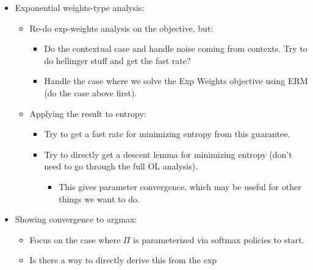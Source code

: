 \documentclass{article}
\begin{document}
\begin{itemize}
\item Exponential weights-type analysis:
  \begin{itemize}
  \item Re-do exp-weights analysis on the objective, but:
    \begin{itemize}
    \item Do the contextual case and handle noise coming from
      contexts. Try to do hellinger stuff and get the fast rate? 
    \item Handle the case where we solve the Exp Weights objective
      using ERM (do the case above first).
    \end{itemize}
    \item Applying the result to entropy:
      \begin{itemize}
      \item Try to get a fast rate for minimizing entropy from
        this guarantee.
      \item Try to directly get a descent lemma for minimizing entropy
        (don't need to go through the full OL analysis).
        \begin{itemize}
        \item This gives parameter convergence, which may be useful
          for other things we want to do.
        \end{itemize}
    \end{itemize}
  \end{itemize}
\item Showing convergence to argmax:
  \begin{itemize}
  \item Focus on the case where $\Pi$ is parameterized via softmax
    policies to start.
  \item Is there a way to directly derive this from the exp
    

\end{itemize}
\end{itemize}
\end{document}
